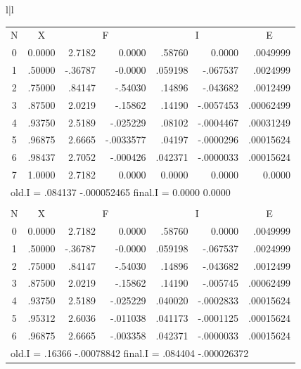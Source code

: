 \begin{figure}[H]
\begin{tabular}{l|l}
\begin{tabular}{ccrrrrr}
            \multicolumn{1}{c}{N} & \multicolumn{1}{c}{X} &
            \multicolumn{2}{c}{F} & \multicolumn{2}{c}{I} &
            \multicolumn{1}{c}{E} \\
            0 & 0.0000 & 2.7182  &  0.0000    & .58760  & 0.0000    & .0049999 \\
            1 & .50000 & -.36787 & -0.0000    & .059198 & -.067537  & .0024999 \\
            2 & .75000 &  .84147 &  -.54030   & .14896  & -.043682  & .0012499 \\
            3 & .87500 & 2.0219  &  -.15862   & .14190  & -.0057453 & .00062499 \\
            4 & .93750 & 2.5189  &  -.025229  & .08102  & -.0004467 & .00031249 \\
            5 & .96875 & 2.6665  &  -.0033577 & .04197  & -.0000296 & .00015624 \\
            6 & .98437 & 2.7052  &  -.000426  & .042371 & -.0000033 & .00015624 \\
            7 & 1.0000 & 2.7182  &  0.0000    & 0.0000  & 0.0000    & 0.0000 \\
            \multicolumn{7}{l}{old.I = .084137 -.000052465 \hfill final.I = 0.0000 0.0000} \\
        \\
            \multicolumn{1}{c}{N} & \multicolumn{1}{c}{X} &
            \multicolumn{2}{c}{F} & \multicolumn{2}{c}{I} &
            \multicolumn{1}{c}{E} \\
            0 & 0.0000 & 2.7182  &  0.0000   & .58760  & 0.0000    & .0049999 \\
            1 & .50000 & -.36787 & -0.0000   & .059198 & -.067537  & .0024999 \\
            2 & .75000 &  .84147 &  -.54030  & .14896  & -.043682  & .0012499 \\
            3 & .87500 & 2.0219  &  -.15862  & .14190  & -.005745  & .00062499 \\
            4 & .93750 & 2.5189  &  -.025229 & .040020 & -.0002833 & .00015624 \\
            5 & .95312 & 2.6036  &  -.011038 & .041173 & -.0001125 & .00015624 \\
            6 & .96875 & 2.6665  &  -.003358 & .042371 & -.0000033 & .00015624 \\
            \multicolumn{7}{l}{old.I = .16366 -.00078842 \hfill final.I = .084404 -.000026372} \\
        \end{tabular}
    \end{tabular}
\end{figure}